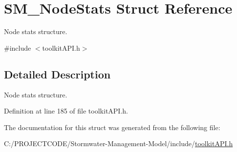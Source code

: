 \hypertarget{struct_s_m___node_stats}{}\section{S\+M\+\_\+\+Node\+Stats Struct Reference}
\label{struct_s_m___node_stats}


Node stats structure.  




{\ttfamily \#include $<$toolkit\+A\+P\+I.\+h$>$}



\subsection{Detailed Description}
Node stats structure. 

Definition at line 185 of file toolkit\+A\+P\+I.\+h.



The documentation for this struct was generated from the following file\+:\begin{DoxyCompactItemize}
\item 
C\+:/\+P\+R\+O\+J\+E\+C\+T\+C\+O\+D\+E/\+Stormwater-\/\+Management-\/\+Model/include/\hyperlink{toolkit_a_p_i_8h}{toolkit\+A\+P\+I.\+h}\end{DoxyCompactItemize}
